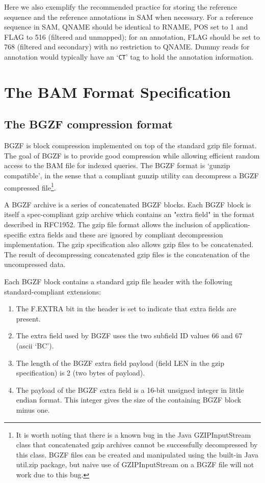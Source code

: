 \documentclass[10pt]{article}
\begin{document}
Here we also exemplify the recommended practice for storing the reference
sequence and the reference annotations in SAM when necessary. For a reference
sequence in SAM, {\sf QNAME} should be identical to {\sf RNAME}, {\sf POS} set
to 1 and {\sf FLAG} to 516 (filtered and unmapped); for an annotation, {\sf
FLAG} should be set to 768 (filtered and secondary) with no restriction to {\sf
QNAME}. Dummy reads for annotation would typically have an `{\tt CT}' tag to
hold the annotation information.

\pagebreak

\section{The BAM Format Specification}

\subsection{The BGZF compression format}

BGZF is block compression implemented on top of the standard gzip file
format. The goal of BGZF is to provide good compression while allowing
efficient random access to the BAM file for indexed queries. The BGZF
format is `gunzip compatible', in the sense that a compliant gunzip
utility can decompress a BGZF compressed file\footnote{It is worth noting that there is a known bug in the Java {\sf
  GZIPInputStream} class that concatenated gzip archives cannot be
successfully decompressed by this class. BGZF files can be created and
manipulated using the built-in Java {\sf util.zip} package, but naive
use of {\sf GZIPInputStream} on a BGZF file will not work due to this
bug.}.

A BGZF archive is a series of concatenated BGZF blocks. Each BGZF block
is itself a spec-compliant gzip archive which contains an "extra field"
in the format described in RFC1952. The gzip file format allows the
inclusion of application-specific extra fields and these are ignored by
compliant decompression implementation. The gzip specification also
allows gzip files to be concatenated. The result of decompressing
concatenated gzip files is the concatenation of the uncompressed data.

Each BGZF block contains a standard gzip file header with the following
standard-compliant extensions:

\begin{enumerate}
\item The {\sf F.EXTRA} bit in the header is set to indicate that extra
  fields are present.
\item The extra field used by BGZF uses the two subfield ID values 66 and 67 (ascii `BC').
\item The length of the BGZF extra field payload (field {\sf LEN} in the
  gzip specification) is 2 (two bytes of payload).
\item The payload of the BGZF extra field is a 16-bit unsigned integer
  in little endian format. This integer gives the size of the containing
  BGZF block minus one.
\end{enumerate}
\end{document}
